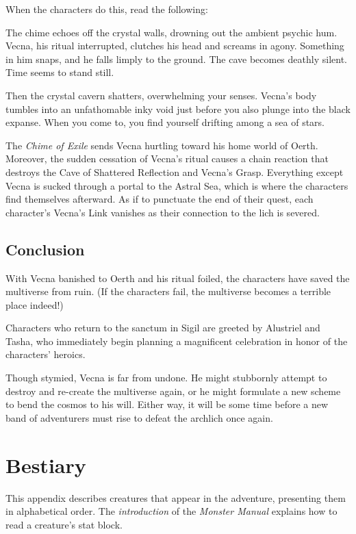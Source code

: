 \documentclass[10pt,a4paper,twoside,bg=print,twocolumn,openany,nodeprecatedcode]{dndbook}
\begin{document}
When the characters do this, read the following:

\begin{DndReadAloud}{}
The chime echoes off the crystal walls, drowning out the ambient psychic hum. Vecna, his ritual interrupted, clutches his head and screams in agony. Something in him snaps, and he falls limply to the ground. The cave becomes deathly silent. Time seems to stand still.

Then the crystal cavern shatters, overwhelming your senses. Vecna's body tumbles into an unfathomable inky void just before you also plunge into the black expanse. When you come to, you find yourself drifting among a sea of stars.

\end{DndReadAloud}

The \textit{Chime of Exile} sends Vecna hurtling toward his home world of Oerth. Moreover, the sudden cessation of Vecna's ritual causes a chain reaction that destroys the Cave of Shattered Reflection and Vecna's Grasp. Everything except Vecna is sucked through a portal to the Astral Sea, which is where the characters find themselves afterward. As if to punctuate the end of their quest, each character's Vecna's Link vanishes as their connection to the lich is severed.

\section{Conclusion}
With Vecna banished to Oerth and his ritual foiled, the characters have saved the multiverse from ruin. (If the characters fail, the multiverse becomes a terrible place indeed!)

Characters who return to the sanctum in Sigil are greeted by Alustriel and Tasha, who immediately begin planning a magnificent celebration in honor of the characters' heroics.

Though stymied, Vecna is far from undone. He might stubbornly attempt to destroy and re-create the multiverse again, or he might formulate a new scheme to bend the cosmos to his will. Either way, it will be some time before a new band of adventurers must rise to defeat the archlich once again.

\appendix
\chapter{Bestiary}
This appendix describes creatures that appear in the adventure, presenting them in alphabetical order. The \textit{introduction} of the \textit{Monster Manual} explains how to read a creature's stat block.
\end{document}
